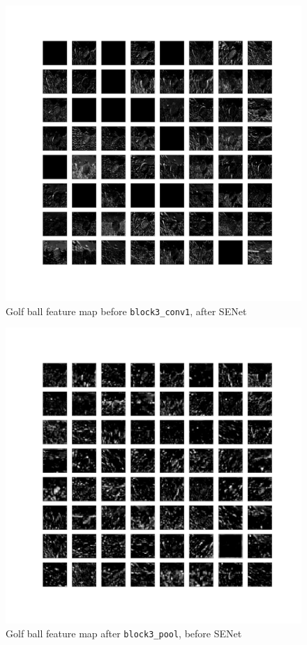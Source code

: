 \documentclass{article}
\begin{document}
\begin{appendices}
\begin{figure}[H]
    \centering
    \includegraphics[width=6in]{csci-8110/hw-3/images/golf-post-SENet-block2_pool-2020-11-05 18_25_10.151699_output.png}
    \caption{Golf ball feature map before \lstinline{block3_conv1}, after SENet}
    \label{fig:golf_2_post}
\end{figure}
\begin{figure}[H]
    \centering
    \includegraphics[width=6in]{csci-8110/hw-3/images/golf-pre-SENet-block3_pool-2020-11-05 18_29_43.542902_output.png}
    \caption{Golf ball feature map after \lstinline{block3_pool}, before SENet}
    \label{fig:golf_3_pre}
\end{figure}


\end{appendices}
\end{document}
